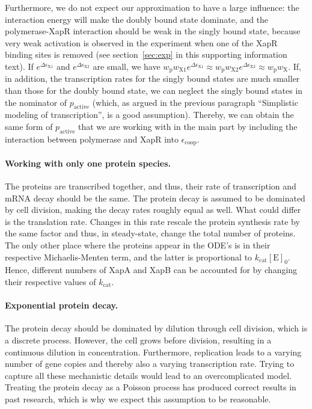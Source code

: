 \documentclass[10pt,letterpaper]{article}
\newcommand{\n}[1]{\mathrm{#1}}
\begin{document}
Furthermore, we do not expect our approximation to have a large influence: the interaction energy will make the doubly bound state dominate, and the polymerase-XapR interaction should be weak in the singly bound state, because very weak activation is observed in the experiment when one of the XapR binding sites is removed (see section~\ref{sec:exp} in this supporting information text). If $e^{\Delta \epsilon_{\n{X1}}}$ and $e^{\Delta \epsilon_{\n{X2}}}$ are small, we have $w_{\n{p}} w_{\n{X1}} e^{\Delta \epsilon_{\n{X1}}} \approx w_{\n{p}} w_{\n{X2}} e^{\Delta \epsilon_{\n{X2}}} \approx w_{\n{p}} w_{\n{X}}$. If, in addition, the transcription rates for the singly bound states are much smaller than those for the doubly bound state, we can neglect the singly bound states in the nominator of $p_{\n{active}}$ (which, as argued in the previous paragraph ``Simplistic modeling of transcription'', is a good assumption). Thereby, we can obtain the same form of $p_{\n{active}}$ that we are working with in the main part by including the interaction between polymerase and XapR into $\epsilon_{\n{coop}}$.

\paragraph*{Working with only one protein species.}
The proteins are transcribed together, and thus, their rate of transcription and mRNA decay should be the same. The protein decay is assumed to be dominated by cell division, making the decay rates roughly equal as well. What could differ is the translation rate. Changes in this rate rescale the protein synthesis rate by the same factor and thus, in steady-state, change the total number of proteins. The only other place where the proteins appear in the ODE's is in their respective Michaelis-Menten term, and the latter is proportional to $k_{\n{cat}} \n{[E]_0}$. Hence, different numbers of XapA and XapB can be accounted for by changing their respective values of $k_{\n{cat}}$.

\paragraph*{Exponential protein decay.}
The protein decay should be dominated by dilution through cell division, which is a discrete process. However, the cell grows before division, resulting in a continuous dilution in concentration. Furthermore, replication leads to a varying number of gene copies and thereby also a varying transcription rate. Trying to capture all these mechanistic details would lead to an overcomplicated model. Treating the protein decay as a Poisson process has produced correct results in past research, which is why we expect this assumption to be reasonable. 
\end{document}
